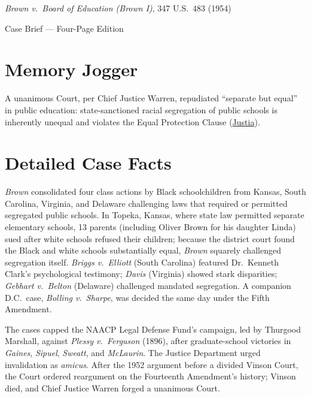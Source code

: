 \documentclass[12pt]{article}
\begin{document}
\begin{center}
{\LARGE \textit{Brown v.\ Board of Education (Brown I)}, 347 U.S.\ 483 (1954)\par}
\vspace{0.8em}
{\large Case Brief --- Four-Page Edition\par}
\end{center}
\vspace{1em}

\section{Memory Jogger}

A unanimous Court, per Chief Justice Warren, repudiated ``separate but equal'' in public education: state-sanctioned racial segregation of public schools is inherently unequal and violates the Equal Protection Clause (\href{https://supreme.justia.com/cases/federal/us/347/483/}{Justia}).

\section{Detailed Case Facts}

\textit{Brown} consolidated four class actions by Black schoolchildren from Kansas, South Carolina, Virginia, and Delaware challenging laws that required or permitted segregated public schools. In Topeka, Kansas, where state law permitted separate elementary schools, 13 parents (including Oliver Brown for his daughter Linda) sued after white schools refused their children; because the district court found the Black and white schools substantially equal, \textit{Brown} squarely challenged segregation itself. \textit{Briggs v.\ Elliott} (South Carolina) featured Dr.\ Kenneth Clark's psychological testimony; \textit{Davis} (Virginia) showed stark disparities; \textit{Gebhart v.\ Belton} (Delaware) challenged mandated segregation. A companion D.C.\ case, \textit{Bolling v.\ Sharpe}, was decided the same day under the Fifth Amendment.

The cases capped the NAACP Legal Defense Fund's campaign, led by Thurgood Marshall, against \textit{Plessy v.\ Ferguson} (1896), after graduate-school victories in \textit{Gaines}, \textit{Sipuel}, \textit{Sweatt}, and \textit{McLaurin}. The Justice Department urged invalidation as \textit{amicus}. After the 1952 argument before a divided Vinson Court, the Court ordered reargument on the Fourteenth Amendment's history; Vinson died, and Chief Justice Warren forged a unanimous Court.
\end{document}

